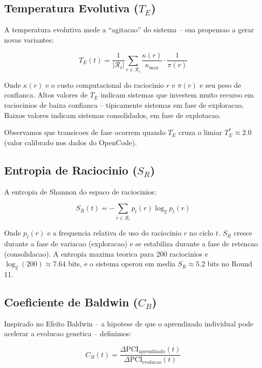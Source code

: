 \documentclass[5p]{elsarticle}
\begin{document}
\subsection{Temperatura Evolutiva ($T_E$)}

A temperatura evolutiva mede a ``agitacao'' do sistema -- sua propensao a
gerar novas variantes:

\begin{equation}
  T_E(t) = \frac{1}{|\mathcal{R}_t|} \sum_{r \in \mathcal{R}_t} \frac{\kappa(r)}{\kappa_{\max}} \cdot \frac{1}{\pi(r)}
\end{equation}

Onde $\kappa(r)$ e o custo computacional do raciocinio $r$ e $\pi(r)$ e seu
peso de confianca. Altos valores de $T_E$ indicam sistemas que investem
muito recurso em raciocinios de baixa confianca -- tipicamente sistemas em
fase de exploracao. Baixos valores indicam sistemas consolidados, em fase
de explotacao.

Observamos que transicoes de fase ocorrem quando $T_E$ cruza o limiar
$T_E^* \approx 2.0$ (valor calibrado nos dados do OpenCode).

\subsection{Entropia de Raciocinio ($S_R$)}

A entropia de Shannon do espaco de raciocinios:

\begin{equation}
  S_R(t) = -\sum_{r \in \mathcal{R}_t} p_t(r) \log_2 p_t(r)
\end{equation}

Onde $p_t(r)$ e a frequencia relativa de uso do raciocinio $r$ no ciclo $t$.
$S_R$ cresce durante a fase de variacao (exploracao) e se estabiliza durante
a fase de retencao (consolidacao). A entropia maxima teorica para 200
raciocinios e $\log_2(200) \approx 7.64$ bits, e o sistema operou em media
$S_R \approx 5.2$ bits no Round 11.

\subsection{Coeficiente de Baldwin ($C_B$)}

Inspirado no Efeito Baldwin \cite{baldwin1896,weber2001} -- a hipotese de
que o aprendizado individual pode acelerar a evolucao genetica -- definimos:

\begin{equation}
  C_B(t) = \frac{\Delta \text{PCI}_{\text{aprendizado}}(t)}{\Delta \text{PCI}_{\text{evolucao}}(t)}
\end{equation}
\end{document}
